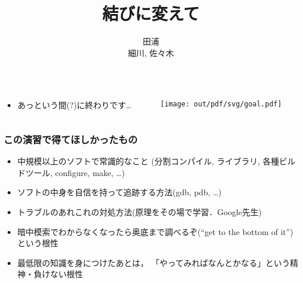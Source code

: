 \documentclass[12pt,dvipdfmx]{beamer}
\title{結びに変えて}
\institute{}
\author{田浦 \\ 細川, 佐々木}
\date{}
\newcommand{\ao}[1]{{\color{blue}#1}}
\begin{document}
\maketitle

\begin{frame}
\begin{columns}
\begin{column}{0.4\textwidth}
\begin{itemize}
\item あっという間(?)に終わりです\ldots
\end{itemize}
\end{column}
\begin{column}{0.6\textwidth}
\begin{center}
\texttt{[image: out/pdf/svg/goal.pdf]}
\end{center}
\end{column}
\end{columns}
\end{frame}

\begin{frame}
\frametitle{この演習で得てほしかったもの}
\begin{itemize}
\item<1-> 中規模以上のソフトで常識的なこと
  \ao{(分割コンパイル, ライブラリ, 各種ビルドツール, configure, make, \ldots)}
\item<2-> ソフトの中身を自信を持って追跡する方法\ao{(gdb, pdb, \ldots)}
\item<3-> トラブルのあれこれの対処方法\ao{(原理をその場で学習．Google先生)}
\item<4-> 暗中模索でわからなくなったら奥底まで調べるぞ(``get to the bottom of it'')
  という\ao{根性}
\item<5-> 最低限の知識を身につけたあとは，
「やってみればなんとかなる」という精神・負けない\ao{根性}
\end{itemize}
\end{frame}
\end{document}
